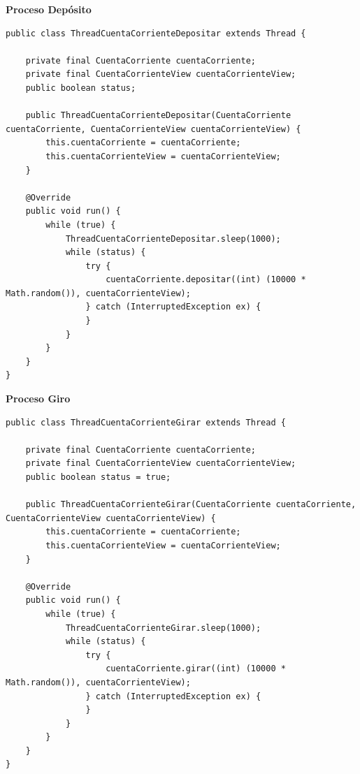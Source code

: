 \documentclass[10pt]{article}
\begin{document}
	\textbf{Proceso Dep\'osito}
	\begin{verbatim}
public class ThreadCuentaCorrienteDepositar extends Thread {

    private final CuentaCorriente cuentaCorriente;
    private final CuentaCorrienteView cuentaCorrienteView;
    public boolean status;

    public ThreadCuentaCorrienteDepositar(CuentaCorriente cuentaCorriente, CuentaCorrienteView cuentaCorrienteView) {
        this.cuentaCorriente = cuentaCorriente;
        this.cuentaCorrienteView = cuentaCorrienteView;
    }

    @Override
    public void run() {
        while (true) {
            ThreadCuentaCorrienteDepositar.sleep(1000);
            while (status) {
                try {
                    cuentaCorriente.depositar((int) (10000 * Math.random()), cuentaCorrienteView);
                } catch (InterruptedException ex) {
                }
            }
        }
    }
}
	\end{verbatim}
	\newpage
	\textbf{Proceso Giro}
	\begin{verbatim}
public class ThreadCuentaCorrienteGirar extends Thread {

    private final CuentaCorriente cuentaCorriente;
    private final CuentaCorrienteView cuentaCorrienteView;
    public boolean status = true;

    public ThreadCuentaCorrienteGirar(CuentaCorriente cuentaCorriente, CuentaCorrienteView cuentaCorrienteView) {
        this.cuentaCorriente = cuentaCorriente;
        this.cuentaCorrienteView = cuentaCorrienteView;
    }

    @Override
    public void run() {
        while (true) {
            ThreadCuentaCorrienteGirar.sleep(1000);
            while (status) {
                try {
                    cuentaCorriente.girar((int) (10000 * Math.random()), cuentaCorrienteView);
                } catch (InterruptedException ex) {
                }
            }
        }
    }
}
	\end{verbatim}
\end{document}
